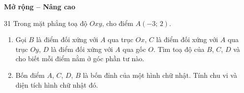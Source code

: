 \documentclass[11pt]{article}
\newcommand{\dividerbar}[1]{\par\vspace{0.6em}\noindent
  \begin{tcolorbox}[enhanced,frame hidden,interior hidden,borderline west={5pt}{0pt}{ProbBlue},
    colback=white,left=12pt,right=12pt,top=5pt,bottom=5pt,arc=4pt]
  {\large\bfseries\color{ProbBlue} #1}\end{tcolorbox}\vspace{0.4em}}
\begin{document}
\clearpage
\dividerbar{Mở rộng -- Nâng cao}

\begin{probbox}{31}{\relax}
Trong mặt phẳng toạ độ $Oxy$, cho điểm $A(-3;\,2)$.
\begin{enumerate}[label=\alph*),leftmargin=1.6em,itemsep=0pt,topsep=2pt]
  \item Gọi $B$ là điểm đối xứng với $A$ qua trục $Ox$, $C$ là điểm đối xứng với $A$ qua trục $Oy$, $D$ là điểm đối xứng với $A$ qua gốc $O$. Tìm toạ độ của $B$, $C$, $D$ và cho biết mỗi điểm nằm ở góc phần tư nào.
  \item Bốn điểm $A$, $C$, $D$, $B$ là bốn đỉnh của một hình chữ nhật. Tính chu vi và diện tích hình chữ nhật đó.
\end{enumerate}
\end{probbox}
\end{document}
